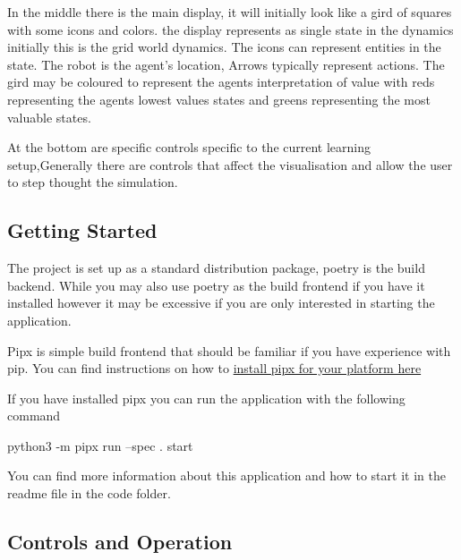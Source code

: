 \documentclass[]{final_report}
\begin{document}
In the middle there is the main display, it will initially look like a gird of squares with some icons and colors. the display represents as single state in the dynamics initially this is the grid world dynamics. The icons can represent entities in the state. The robot is the agent's location, Arrows typically represent actions. The gird may be coloured to represent the agents interpretation of value with reds representing the agents lowest values states and greens representing the most valuable states.

At the bottom are specific controls specific to the current learning setup,Generally there are controls that affect the visualisation and allow the user to step thought the simulation. 

\subsection{Getting Started}

The project is set up as a standard distribution package, poetry is the build backend. While you may also use poetry as the build frontend if you have it installed however it may be excessive if you are only interested in starting the application.

Pipx is simple build frontend that should be familiar if you have experience with pip. You can find instructions on how to \href{https://pipx.pypa.io/stable/installation/}{install pipx for your platform here}

If you have installed pipx you can run the application with the following command

\begin{verbatim*}
  python3 -m pipx run --spec . start
\end{verbatim*}

You can find more information about this application and how to start it in the readme file in the code folder.

\subsection{Controls and Operation}




\end{document}
